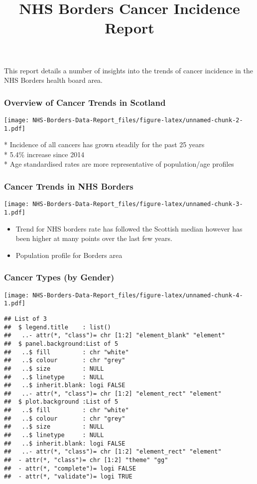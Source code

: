 \documentclass[
]{article}
\title{NHS Borders Cancer Incidence Report}
\author{}
\date{\vspace{-2.5em}}
\providecommand{\tightlist}{%
  \setlength{\itemsep}{0pt}\setlength{\parskip}{0pt}}
\begin{document}
\maketitle

This report details a number of insights into the trends of cancer
incidence in the NHS Borders health board area.

\hypertarget{overview-of-cancer-trends-in-scotland}{%
\subsubsection{Overview of Cancer Trends in
Scotland}\label{overview-of-cancer-trends-in-scotland}}

\texttt{[image: NHS-Borders-Data-Report\_files/figure-latex/unnamed-chunk-2-1.pdf]}

* Incidence of all cancers has grown steadily for the past 25 years\\
* 5.4\% increase since 2014\\
* Age standardised rates are more representative of population/age
profiles

\hypertarget{cancer-trends-in-nhs-borders}{%
\subsubsection{Cancer Trends in NHS
Borders}\label{cancer-trends-in-nhs-borders}}

\texttt{[image: NHS-Borders-Data-Report\_files/figure-latex/unnamed-chunk-3-1.pdf]}

\begin{itemize}
\tightlist
\item
  Trend for NHS borders rate has followed the Scottish median however
  has been higher at many points over the last few years.
\item
  Population profile for Borders area \(~\) \(~\) \(~\)
\end{itemize}

\hypertarget{cancer-types-by-gender}{%
\subsubsection{Cancer Types (by Gender)}\label{cancer-types-by-gender}}

\texttt{[image: NHS-Borders-Data-Report\_files/figure-latex/unnamed-chunk-4-1.pdf]}

\begin{verbatim}
## List of 3
##  $ legend.title    : list()
##   ..- attr(*, "class")= chr [1:2] "element_blank" "element"
##  $ panel.background:List of 5
##   ..$ fill         : chr "white"
##   ..$ colour       : chr "grey"
##   ..$ size         : NULL
##   ..$ linetype     : NULL
##   ..$ inherit.blank: logi FALSE
##   ..- attr(*, "class")= chr [1:2] "element_rect" "element"
##  $ plot.background :List of 5
##   ..$ fill         : chr "white"
##   ..$ colour       : chr "grey"
##   ..$ size         : NULL
##   ..$ linetype     : NULL
##   ..$ inherit.blank: logi FALSE
##   ..- attr(*, "class")= chr [1:2] "element_rect" "element"
##  - attr(*, "class")= chr [1:2] "theme" "gg"
##  - attr(*, "complete")= logi FALSE
##  - attr(*, "validate")= logi TRUE
\end{verbatim}
\end{document}
